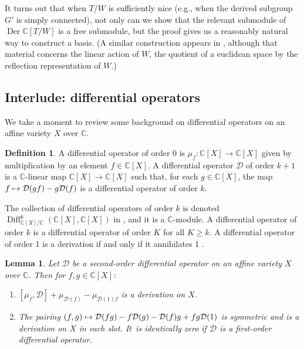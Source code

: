 \documentclass[JEP,XML,SOM,Unicode,NoFloatCountersInSection,published]{cedram}
\newenvironment{enumeratea}
{\bgroup\def\theenumi{\alph{enumi}}\def\theenumii{\roman{enumii}}\begin{enumerate}}
{\end{enumerate}\egroup}
\newcommand\mto{\mathchoice{\longmapsto}{\mapsto}{\mapsto}{\mapsto}}
\newtheorem{lem}[equation]{Lemma}
\theoremstyle{definition}
\newtheorem{defn}[equation]{Definition}
\newcommand{\stacklink}[1]{\href{https://stacks.math.columbia.edu/tag/#1}{#1}}
\newcommand{\stacks}[1]{\cite[Tag \stacklink{#1}]{stacks-project}}
\newcommand{\C}{\mathbb{C}}
\newcommand{\mcD}{\mathcal{D}}
\DeclareMathOperator{\Der}{Der}
\DeclareMathOperator{\Diff}{Diff}
\begin{document}
It turns out that when $T/W$ is sufficiently nice (e.g., when the derived subgroup $G'$ is
simply connected), not only can we show that the relevant submodule of
$\Der \C[T/W]$ is a free submodule, but the proof gives us a reasonably
natural way to construct a basis. (A similar construction appears in \cite[\S{B.2}]{OrlikTerao}, although that material concerns the linear
action of $W$, the quotient of a euclidean space by the reflection
representation of $W$.)

\subsection*{Interlude: differential operators}

We take a moment to review some background on differential operators on an affine variety $X$ over $\C$.

\begin{defn}
A differential operator of order 0 is $\mu_f \colon \C[X] \to \C[X]$ given by multiplication by an element $f \in \C[X]$. A differential operator $\mcD$ of order $k + 1$ is a $\C$-linear map $\C[X] \to \C[X]$ such that, for each $g \in \C[X]$, the map $f \mto \mcD(gf) - g\mcD(f)$ is a differential operator of order $k$.
\end{defn}

The collection of differential operators of order $k$ is denoted $\Diff^k_{\C[X]/\C}(\C[X], \C[X])$ in \stacks{09CH}, and it is a $\C$-module.
A differential operator of order $k$ is a differential operator of order $K$ for all $K \ge k$. A differential operator of order 1 is a derivation if and only if it annihilates 1 \stacks{09CM}.

\begin{lem} \label{diffop}
Let $\mcD$ be a second-order differential operator on an affine variety $X$ over $\C$. Then for $f, g \in \C[X]$:
\begin{enumeratea}
\item \label{diffop.der} $[\mu_f, \mcD] + \mu_{\mcD(f)} - \mu_{\mcD(1)f}$ is a derivation on $X$.
\item \label{diffop.bider} The pairing $(f, g) \mto \mcD(fg) - f \mcD(g) - \mcD(f)g + fg \mcD(1)$ is symmetric and is a derivation on $X$ in each slot. It~is identically zero if $\mcD$ is a first-order differential operator.
\end{enumeratea}
\end{lem}
\end{document}

